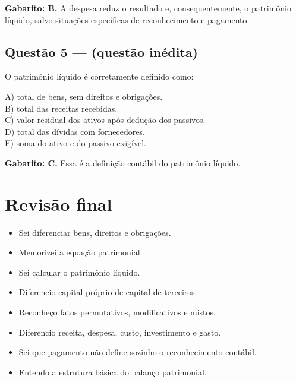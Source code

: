 \documentclass[11pt,a4paper]{article}
\begin{document}
\begin{alerta}
\textbf{Gabarito: B.} A despesa reduz o resultado e, consequentemente, o patrimônio líquido, salvo situações específicas de reconhecimento e pagamento.
\end{alerta}

\subsection*{Questão 5 — (questão inédita)}

O patrimônio líquido é corretamente definido como:

A) total de bens, sem direitos e obrigações. \\ B) total das receitas recebidas. \\ C) valor residual dos ativos após dedução dos passivos. \\ D) total das dívidas com fornecedores. \\ E) soma do ativo e do passivo exigível.

\begin{alerta}
\textbf{Gabarito: C.} Essa é a definição contábil do patrimônio líquido.
\end{alerta}

\section*{Revisão final}

\begin{itemize}
  \item[$\square$] Sei diferenciar bens, direitos e obrigações.
  \item[$\square$] Memorizei a equação patrimonial.
  \item[$\square$] Sei calcular o patrimônio líquido.
  \item[$\square$] Diferencio capital próprio de capital de terceiros.
  \item[$\square$] Reconheço fatos permutativos, modificativos e mistos.
  \item[$\square$] Diferencio receita, despesa, custo, investimento e gasto.
  \item[$\square$] Sei que pagamento não define sozinho o reconhecimento contábil.
  \item[$\square$] Entendo a estrutura básica do balanço patrimonial.
\end{itemize}
\end{document}
